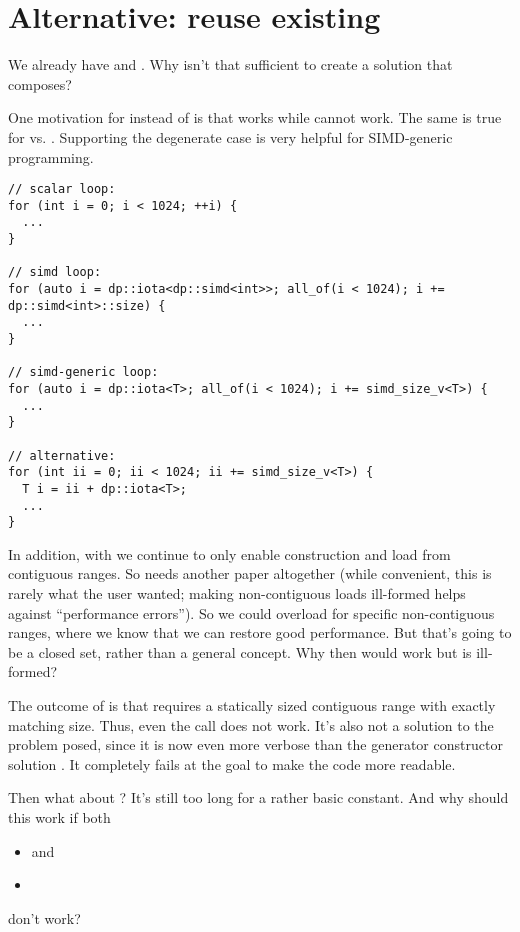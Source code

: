 \section{Alternative: reuse existing }

We already have  and .
Why isn't that sufficient to create a solution that composes?

One motivation for  instead of 
is that  works while  cannot work.
The same is true for  vs.
.
Supporting the degenerate case is very helpful for SIMD-generic programming.

\medskip\begin{lstlisting}[style=Vc]
// scalar loop:
for (int i = 0; i < 1024; ++i) {
  ...
}

// simd loop:
for (auto i = dp::iota<dp::simd<int>>; all_of(i < 1024); i += dp::simd<int>::size) {
  ...
}

// simd-generic loop:
for (auto i = dp::iota<T>; all_of(i < 1024); i += simd_size_v<T>) {
  ...
}

// alternative:
for (int ii = 0; ii < 1024; ii += simd_size_v<T>) {
  T i = ii + dp::iota<T>;
  ...
}
\end{lstlisting}

In addition, with  we continue to only enable construction and
load from contiguous ranges.
So  needs another paper altogether (while
  convenient, this is rarely what the user wanted; making non-contiguous loads
ill-formed helps against “performance errors”).
So we could overload for specific non-contiguous ranges, where we know that we
can restore good performance.
But that's going to be a closed set, rather than a general concept.
Why then would  work but
 is ill-formed?

The outcome of  is that  requires a statically
sized contiguous range with exactly matching size.
Thus, even the call
 does not work.
It's also not a solution to the problem posed, since it is now even more
verbose than the generator constructor solution .
It completely fails at the goal to make the code more readable.

Then what about ?
It's still too long for a rather basic constant.
And why should this work if both
\begin{itemize}
  \item {} and
  \item {}
\end{itemize}
don't work?

